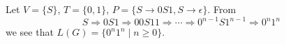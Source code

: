

\setcounter{section}{5}
\setcounter{subsection}{1}
\setcounter{dfn}{4}

\begin{exl}
\label{exl:0n1n}
Let $V = \{S\}$, $T = \{0, 1\}$, $P = \{S \to 0S1, S \to \epsilon\}$.
From
\[
S \Rightarrow 0S1 \Rightarrow 00S11 \Rightarrow \cdots \Rightarrow 0^{n-1}S1^{n-1} \Rightarrow 0^n1^n
\]
we see that $L(G) = \{0^n1^n \mid n \ge 0\}$.
\end{exl}

